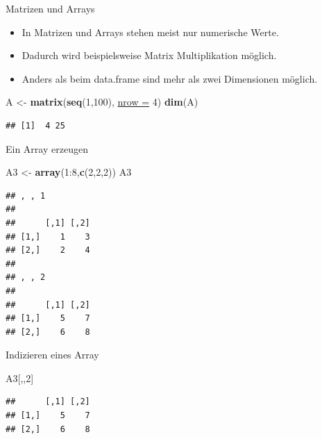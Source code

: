 \documentclass[
  ignorenonframetext,
]{beamer}
\newenvironment{Shaded}{\begin{snugshade}}{\end{snugshade}}
\newcommand{\DataTypeTok}[1]{\textcolor[rgb]{0.74,0.68,0.62}{\underline{#1}}}
\newcommand{\DecValTok}[1]{\textcolor[rgb]{0.27,0.67,0.26}{#1}}
\newcommand{\KeywordTok}[1]{\textcolor[rgb]{0.26,0.66,0.93}{\textbf{#1}}}
\newcommand{\NormalTok}[1]{\textcolor[rgb]{0.74,0.68,0.62}{#1}}
\newcommand{\OperatorTok}[1]{\textcolor[rgb]{0.74,0.68,0.62}{#1}}
\newcommand{\StringTok}[1]{\textcolor[rgb]{0.02,0.61,0.04}{#1}}
\providecommand{\tightlist}{%
  \setlength{\itemsep}{0pt}\setlength{\parskip}{0pt}}
\begin{document}
\begin{frame}[fragile]{Matrizen und Arrays}
\protect\hypertarget{matrizen-und-arrays}{}

\begin{itemize}
\tightlist
\item
  In Matrizen und Arrays stehen meist nur numerische Werte.
\item
  Dadurch wird beispielsweise Matrix Multiplikation möglich.
\item
  Anders als beim data.frame sind mehr als zwei Dimensionen möglich.
\end{itemize}

\begin{Shaded}
\begin{Highlighting}[]
\NormalTok{A <-}\StringTok{ }\KeywordTok{matrix}\NormalTok{(}\KeywordTok{seq}\NormalTok{(}\DecValTok{1}\NormalTok{,}\DecValTok{100}\NormalTok{), }\DataTypeTok{nrow =} \DecValTok{4}\NormalTok{)}
\KeywordTok{dim}\NormalTok{(A)}
\end{Highlighting}
\end{Shaded}

\begin{verbatim}
## [1]  4 25
\end{verbatim}

\end{frame}

\begin{frame}[fragile]{Ein Array erzeugen}
\protect\hypertarget{ein-array-erzeugen}{}

\begin{Shaded}
\begin{Highlighting}[]
\NormalTok{A3 <-}\StringTok{ }\KeywordTok{array}\NormalTok{(}\DecValTok{1}\OperatorTok{:}\DecValTok{8}\NormalTok{,}\KeywordTok{c}\NormalTok{(}\DecValTok{2}\NormalTok{,}\DecValTok{2}\NormalTok{,}\DecValTok{2}\NormalTok{))}
\NormalTok{A3}
\end{Highlighting}
\end{Shaded}

\begin{verbatim}
## , , 1
## 
##      [,1] [,2]
## [1,]    1    3
## [2,]    2    4
## 
## , , 2
## 
##      [,1] [,2]
## [1,]    5    7
## [2,]    6    8
\end{verbatim}

\end{frame}

\begin{frame}[fragile]{Indizieren eines Array}
\protect\hypertarget{indizieren-eines-array}{}

\begin{Shaded}
\begin{Highlighting}[]
\NormalTok{A3[,,}\DecValTok{2}\NormalTok{]}
\end{Highlighting}
\end{Shaded}

\begin{verbatim}
##      [,1] [,2]
## [1,]    5    7
## [2,]    6    8
\end{verbatim}

\end{frame}
\end{document}
